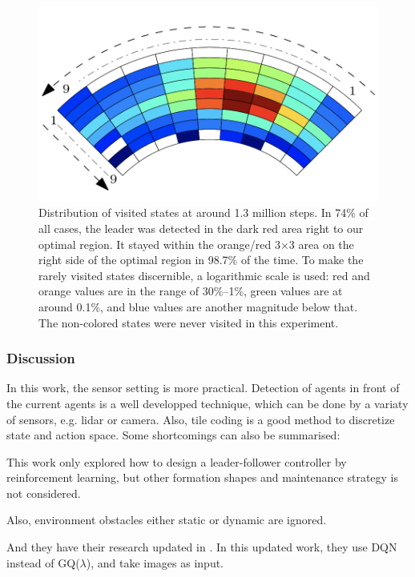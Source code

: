 \begin{figure}
	\centering
	\includegraphics[width=5in]{leaderfollowerlresult2.png}
	\caption{Distribution of visited states at around 1.3 million steps. In 74\% of all cases, the leader was detected in the dark red area right to our optimal region. It stayed within the orange/red 3×3 area on the right side of the optimal region in 98.7\% of the time. To make the rarely visited states discernible, a logarithmic scale is used: red and orange values are in the range of 30\%–1\%, green values are at around 0.1\%, and blue values are another magnitude below that. The non-colored states were never visited in this experiment.}
	\label{fig:leaderfollowerrlresult2} 
\end{figure}

\subsubsection{Discussion}

In this work, the sensor setting is more practical.
Detection of agents in front of the current agents is a well developped technique, which can be done by a variaty of sensors, e.g. lidar or camera.
Also, tile coding is a good method to discretize state and action space.
Some shortcomings can also be summarised:

\begin{compactenum}
	\item This work only explored how to design a leader-follower controller by reinforcement learning, but other formation shapes and maintenance strategy is not considered.
	\item Also, environment obstacles either static or dynamic are ignored.
\end{compactenum}

And they have their research updated in \cite{aykin2018deep}. In this updated work, they use DQN instead of GQ($\lambda$), and take images as input.